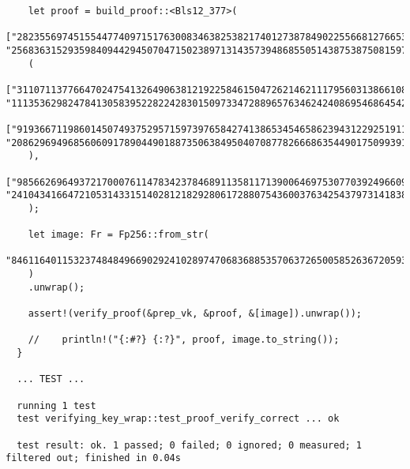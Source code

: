 \documentclass{article}
\begin{document}
\begin{lstlisting}
    let proof = build_proof::<Bls12_377>(
    ["2823556974515544774097151763008346382538217401273878490225566812766536738796196154138387932214916091703926798612", "256836315293598409442945070471502389713143573948685505143875387508159714195596227342715425692593966353228874272253"],
    (
    ["31107113776647024754132649063812192258461504726214621117956031386610890802548704229846887183629711420377939432119", "111353629824784130583952282242830150973347288965763462424086954686454292967282100836332310927094987906314221421873"],
    ["91936671198601450749375295715973976584274138653454658623943122925191168704925205918404144895071632258580325591842", "208629694968560609178904490188735063849504070877826668635449017509939169002653787652914605885048807640820436312893"]
    ),
    ["98566269649372170007611478342378468911358117139006469753077039249660968858754944774214496198826225135709632991983", "241043416647210531433151402812182928061728807543600376342543797314183884387241527972417219291397635999358690899902"]
    );

    let image: Fr = Fp256::from_str(
    "846116401153237484849669029241028974706836885357063726500585263672059318071",
    )
    .unwrap();

    assert!(verify_proof(&prep_vk, &proof, &[image]).unwrap());

    //    println!("{:#?} {:?}", proof, image.to_string());
  }

  ... TEST ...

  running 1 test
  test verifying_key_wrap::test_proof_verify_correct ... ok

  test result: ok. 1 passed; 0 failed; 0 ignored; 0 measured; 1 filtered out; finished in 0.04s

  
\end{lstlisting}
\end{document}
